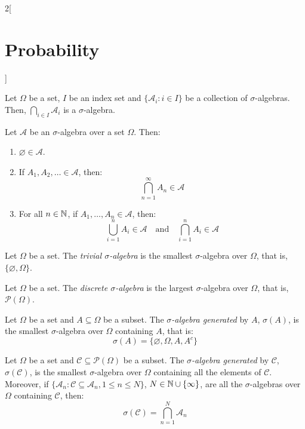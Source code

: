 \documentclass[../../../main.tex]{subfiles}
\begin{document}
\begin{multicols}{2}[\section{Probability}]
\begin{definition}
\begin{enumerate}
    \end{enumerate}
  \end{definition}
  \begin{proposition}
    Let $\Omega$ be a set, $I$ be an index set and $\{\mathcal{A}_i:i\in I\}$ be a collection of $\sigma$-algebras. Then, $\bigcap_{i\in I} \mathcal{A}_i$ is a $\sigma$-algebra.
  \end{proposition}
  \begin{proposition}
    Let $\mathcal{A}$ be an $\sigma$-algebra over a set $\Omega$. Then:
    \begin{enumerate}
      \item $\varnothing\in\mathcal{A}$.
      \item If $A_1,A_2,\ldots\in\mathcal{A}$, then: $$\bigcap_{n=1}^\infty A_n\in\mathcal{A}$$
      \item For all $n\in\mathbb{N}$, if $A_1,\ldots,A_n\in\mathcal{A}$, then: $$\bigcup_{i=1}^nA_i\in\mathcal{A}\quad\text{and}\quad\bigcap_{i=1}^nA_i\in\mathcal{A}$$
    \end{enumerate}
  \end{proposition}
  \begin{definition}
    Let $\Omega$ be a set. The \emph{trivial $\sigma$-algebra} is the smallest $\sigma$-algebra over $\Omega$, that is, $\{\varnothing,\Omega\}$.
  \end{definition}
  \begin{definition}
    Let $\Omega$ be a set. The \emph{discrete $\sigma$-algebra} is the largest $\sigma$-algebra over $\Omega$, that is, $\mathcal{P}(\Omega)$.
  \end{definition}
  \begin{definition}
    Let $\Omega$ be a set and $A\subseteq\Omega$ be a subset. The \emph{$\sigma$-algebra generated} by $A$, $\sigma(A)$, is the smallest $\sigma$-algebra over $\Omega$ containing $A$, that is: $$\sigma(A)=\{\varnothing,\Omega,A,A^c\}$$
  \end{definition}
  \begin{definition}
    Let $\Omega$ be a set and $\mathcal{C}\subseteq\mathcal{P}(\Omega)$ be a subset. The \emph{$\sigma$-algebra generated} by $\mathcal{C}$, $\sigma(\mathcal{C})$, is the smallest $\sigma$-algebra over $\Omega$ containing all the elements of $\mathcal{C}$. Moreover, if $\{\mathcal{A}_n:\mathcal{C}\subseteq\mathcal{A}_n,1\leq n\leq N\}$, $N\in\mathbb{N}\cup\{\infty\}$, are all the $\sigma$-algebras over $\Omega$ containing $\mathcal{C}$, then:
    $$\sigma(\mathcal{C})=\bigcap_{n=1}^N\mathcal{A}_n$$
  \end{definition}

\end{multicols}
\end{document}
